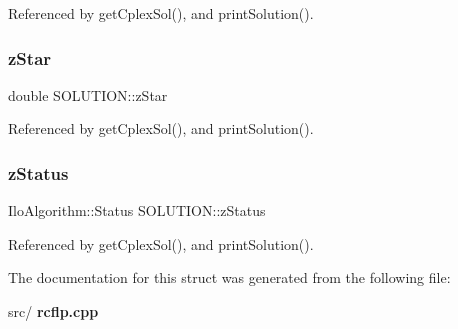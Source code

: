 Referenced by get\+Cplex\+Sol(), and print\+Solution().

\mbox{\label{structSOLUTION_ade090dee207193de4c06605732ede125}} 
\subsubsection{z\+Star}
{\footnotesize\ttfamily double S\+O\+L\+U\+T\+I\+O\+N\+::z\+Star}



Referenced by get\+Cplex\+Sol(), and print\+Solution().

\mbox{\label{structSOLUTION_ae81190f94f47fef19ff54ff8461eabd1}} 
\subsubsection{z\+Status}
{\footnotesize\ttfamily Ilo\+Algorithm\+::\+Status S\+O\+L\+U\+T\+I\+O\+N\+::z\+Status}



Referenced by get\+Cplex\+Sol(), and print\+Solution().



The documentation for this struct was generated from the following file\+:\begin{DoxyCompactItemize}
\item 
src/\textbf{ rcflp.\+cpp}\end{DoxyCompactItemize}
